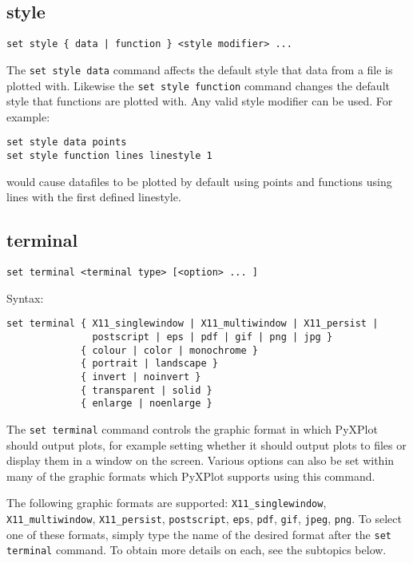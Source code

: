 \documentclass[a4paper,onecolumn,11pt]{book}
\begin{document}
\subsection{style}

\begin{verbatim}
set style { data | function } <style modifier> ...
\end{verbatim}

The {\tt set style data} command affects the default style that data from a file
is plotted with.  Likewise the {\tt set style function} command changes the
default style that functions are plotted with.  Any valid style modifier can be
used.  For example:

\begin{verbatim}
set style data points
set style function lines linestyle 1
\end{verbatim}

would cause datafiles to be plotted by default using points and functions using
lines with the first defined linestyle.
 
\subsection{terminal}

\begin{verbatim}
set terminal <terminal type> [<option> ... ]
\end{verbatim}

Syntax:

\begin{verbatim}
set terminal { X11_singlewindow | X11_multiwindow | X11_persist | 
               postscript | eps | pdf | gif | png | jpg } 
             { colour | color | monochrome } 
             { portrait | landscape } 
             { invert | noinvert } 
             { transparent | solid }
             { enlarge | noenlarge }
\end{verbatim}

The {\tt set terminal} command controls the graphic format in which PyXPlot
should output plots, for example setting whether it should output plots to files
or display them in a window on the screen. Various options can also be set
within many of the graphic formats which PyXPlot supports using this command.

The following graphic formats are supported:  {\tt X11\_singlewindow}, {\tt
X11\_multiwindow}, {\tt X11\_persist}, {\tt postscript}, {\tt eps}, {\tt pdf},
{\tt gif}, {\tt jpeg}, {\tt png}. To select one of these formats, simply type
the name of the desired format after the {\tt set terminal} command. To obtain
more details on each, see the subtopics below.
\end{document}
